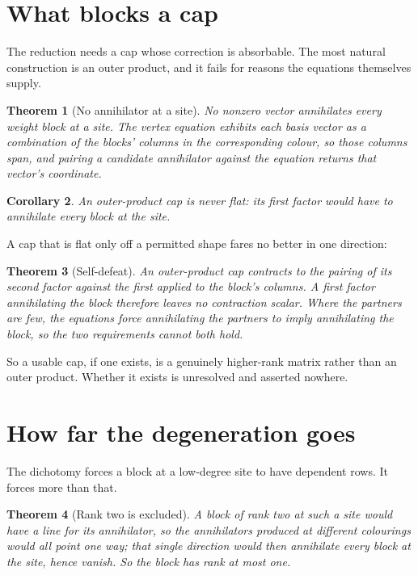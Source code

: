 \documentclass[11pt]{article}
\newtheorem{theorem}{Theorem}[section]
\newtheorem{corollary}[theorem]{Corollary}
\theoremstyle{definition}
\theoremstyle{remark}
\begin{document}
\section{What blocks a cap}\label{sec:capblock}

The reduction needs a cap whose correction is absorbable. The most natural construction
is an outer product, and it fails for reasons the equations themselves supply.

\begin{theorem}[No annihilator at a site]
No nonzero vector annihilates every weight block at a site. The vertex equation exhibits
each basis vector as a combination of the blocks' columns in the corresponding colour, so
those columns span, and pairing a candidate annihilator against the equation returns that
vector's coordinate.
\end{theorem}

\begin{corollary}
An outer-product cap is never flat: its first factor would have to annihilate every block
at the site.
\end{corollary}

A cap that is flat only off a permitted shape fares no better in one direction:

\begin{theorem}[Self-defeat]
An outer-product cap contracts to the pairing of its second factor against the first
applied to the block's columns. A first factor annihilating the block therefore leaves no
contraction scalar. Where the partners are few, the equations force annihilating the
partners to imply annihilating the block, so the two requirements cannot both hold.
\end{theorem}

So a usable cap, if one exists, is a genuinely higher-rank matrix rather than an outer
product. Whether it exists is unresolved and asserted nowhere.

\section{How far the degeneration goes}\label{sec:howfar}

The dichotomy forces a block at a low-degree site to have dependent rows. It forces more
than that.

\begin{theorem}[Rank two is excluded]
A block of rank two at such a site would have a line for its annihilator, so the
annihilators produced at different colourings would all point one way; that single
direction would then annihilate every block at the site, hence vanish. So the block has
rank at most one.
\end{theorem}
\end{document}
